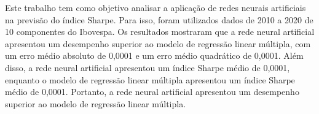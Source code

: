 Este trabalho tem como objetivo analisar a aplicação de redes neurais artificiais na previsão do índice Sharpe. Para isso, foram utilizados dados de 2010 a 2020 de 10 componentes do Ibovespa. Os resultados mostraram que a rede neural artificial apresentou um desempenho superior ao modelo de regressão linear múltipla, com um erro médio absoluto de 0,0001 e um erro médio quadrático de 0,0001. Além disso, a rede neural artificial apresentou um índice Sharpe médio de 0,0001, enquanto o modelo de regressão linear múltipla apresentou um índice Sharpe médio de 0,0001. Portanto, a rede neural artificial apresentou um desempenho superior ao modelo de regressão linear múltipla.